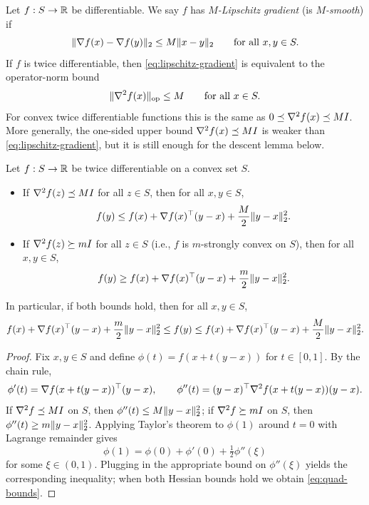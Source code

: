 \begin{definition}
Let $f:S\to\mathbb{R}$ be differentiable.
We say $f$ has \emph{$M$-Lipschitz gradient} (is \emph{$M$-smooth}) if
\begin{equation}
  \lVert\nabla f(x)-\nabla f(y)\rVert_2 \le M \lVert x-y\rVert_2
  \qquad \text{for all } x,y \in S.
  \label{eq:lipschitz-gradient}
\end{equation}
If $f$ is twice differentiable, then \eqref{eq:lipschitz-gradient} is equivalent to the operator-norm bound
\begin{equation}
  \lVert\nabla^2 f(x)\rVert_{\mathrm{op}} \le M
  \qquad \text{for all } x \in S.
  \label{eq:smooth-hess}
\end{equation}
For convex twice differentiable functions this is the same as $0 \preceq \nabla^2 f(x) \preceq M I$.
More generally, the one-sided upper bound $\nabla^2 f(x) \preceq M I$ is weaker than \eqref{eq:lipschitz-gradient}, but it is still enough for the descent lemma below.
\end{definition}

\begin{theorem}
\label{thm:quadratic-bounds}
Let $f:S\to\mathbb{R}$ be twice differentiable on a convex set $S$.
\begin{itemize}[leftmargin=*]
  \item If $\nabla^2 f(z) \preceq MI$ for all $z\in S$, then for all $x,y\in S$,
  \[
    f(y) \le f(x) + \nabla f(x)^\top (y-x) + \frac{M}{2}\lVert y-x\rVert_2^2.
  \]
  \item If $\nabla^2 f(z) \succeq mI$ for all $z\in S$ (i.e., $f$ is $m$-strongly convex on $S$), then for all $x,y\in S$,
  \[
    f(y) \ge f(x) + \nabla f(x)^\top (y-x) + \frac{m}{2}\lVert y-x\rVert_2^2.
  \]
\end{itemize}
In particular, if both bounds hold, then for all $x,y\in S$,
\begin{equation}
  f(x) + \nabla f(x)^\top (y-x) + \frac{m}{2}\lVert y-x\rVert_2^2
  \le f(y)
  \le f(x) + \nabla f(x)^\top (y-x) + \frac{M}{2}\lVert y-x\rVert_2^2.
  \label{eq:quad-bounds}
\end{equation}
\end{theorem}
\begin{proof}
Fix $x,y\in S$ and define $\phi(t)=f(x+t(y-x))$ for $t\in[0,1]$.
By the chain rule,
\[
\phi'(t)=\nabla f(x+t(y-x))^\top (y-x),
\qquad
\phi''(t)=(y-x)^\top \nabla^2 f(x+t(y-x)) (y-x).
\]
If $\nabla^2 f \preceq MI$ on $S$, then $\phi''(t) \le M\lVert y-x\rVert_2^2$; if $\nabla^2 f \succeq mI$ on $S$, then $\phi''(t) \ge m\lVert y-x\rVert_2^2$.
Applying Taylor's theorem to $\phi(1)$ around $t=0$ with Lagrange remainder gives
\[
\phi(1)=\phi(0)+\phi'(0)+\tfrac12 \phi''(\xi)
\]
for some $\xi\in(0,1)$.
Plugging in the appropriate bound on $\phi''(\xi)$ yields the corresponding inequality; when both Hessian bounds hold we obtain \eqref{eq:quad-bounds}.
\end{proof}

